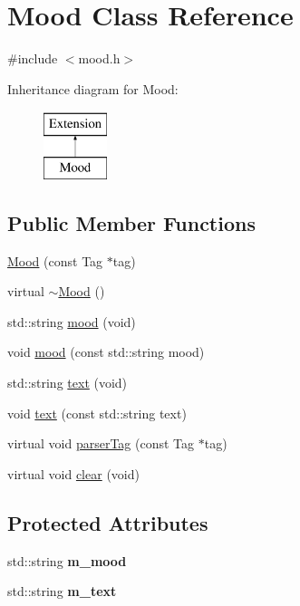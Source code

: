 \hypertarget{classMood}{
\section{Mood Class Reference}
\label{classMood}
}


{\ttfamily \#include $<$mood.h$>$}

Inheritance diagram for Mood:\begin{figure}[H]
\begin{center}
\leavevmode
\includegraphics[height=2.000000cm]{classMood}
\end{center}
\end{figure}
\subsection*{Public Member Functions}
\begin{DoxyCompactItemize}
\item 
\hyperlink{classMood_a74f0b05200196aee6441e8598087cf38}{Mood} (const Tag $\ast$tag)
\item 
virtual \hyperlink{classMood_af05d0232e98c33d209a723e8e052bc91}{$\sim$Mood} ()
\item 
std::string \hyperlink{classMood_ab230f6ab2c1cf243fcc9e2427b143991}{mood} (void)
\item 
void \hyperlink{classMood_afc40b3cb1ac6f77a2cb4d064cd10e476}{mood} (const std::string mood)
\item 
std::string \hyperlink{classMood_aa327ec8f5f43d29f8156bfba98b6fcf2}{text} (void)
\item 
void \hyperlink{classMood_a6ec49730046bc12e82743e618630a5f8}{text} (const std::string text)
\item 
virtual void \hyperlink{classMood_a400302483e741c6e3b2359e303abb7b0}{parserTag} (const Tag $\ast$tag)
\item 
virtual void \hyperlink{classMood_aa6f1f32d31e93be36244c0e83747649e}{clear} (void)
\end{DoxyCompactItemize}
\subsection*{Protected Attributes}
\begin{DoxyCompactItemize}
\item 
\hypertarget{classMood_a85e0b4f37c020a8381366b34123ce587}{
std::string {\bfseries m\_\-mood}}
\label{classMood_a85e0b4f37c020a8381366b34123ce587}

\item 
\hypertarget{classMood_a413c21b292450f8cc3b0f58f05f59547}{
std::string {\bfseries m\_\-text}}
\label{classMood_a413c21b292450f8cc3b0f58f05f59547}

\end{DoxyCompactItemize}
